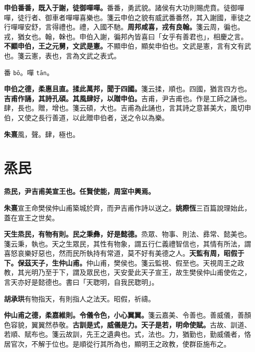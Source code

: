 \textbf{申伯番番，既入于謝，徒御嘽嘽。}{\footnotesize 番番，勇武貌。諸侯有大功則賜虎賁。徒御嘽嘽，徒行者、御車者嘽嘽喜樂也。箋云申伯之貌有威武番番然，其入謝國，車徒之行嘽嘽安舒，言得禮也。禮，入國不馳。}\textbf{周邦咸喜，戎有良翰。}{\footnotesize 箋云周，徧也。戎，猶女也。翰，榦也。申伯入謝，徧邦內皆喜曰「女乎有善君也」，相慶之言。}\textbf{不顯申伯，王之元舅，文武是憲。}{\footnotesize 不顯申伯，顯矣申伯也。文武是憲，言有文有武也。箋云憲，表也，言為文武之表式。}

\begin{quoting}番 \texttt{bō}。嘽 \texttt{tān}。\end{quoting}

\textbf{申伯之德，柔惠且直。揉此萬邦，聞于四國。}{\footnotesize 箋云揉，順也。四國，猶言四方也。}\textbf{吉甫作誦，其詩孔碩。其風肆好，以贈申伯。}{\footnotesize 吉甫，尹吉甫也。作是工師之誦也。肆，長也。贈，增也。箋云碩，大也。吉甫為此誦也，言其詩之意甚美大，風切申伯，又使之長行善道，以此贈申伯者，送之令以為樂。}

\begin{quoting}\textbf{朱熹}風，聲。肆，極也。\end{quoting}

\section{烝民}


\textbf{烝民，尹吉甫美宣王也。任賢使能，周室中興焉。}

\begin{quoting}\textbf{朱熹}宣王命樊侯仲山甫築城於齊，而尹吉甫作詩以送之。\textbf{姚際恆}三百篇說理始此，蓋在宣王之世矣。\end{quoting}

\textbf{天生烝民，有物有則。民之秉彝，好是懿德。}{\footnotesize 烝眾、物事、則法、彞常、懿美也。箋云秉，執也。天之生眾民，其性有物象，謂五行仁義禮智信也，其情有所法，謂喜怒哀樂好惡也，然而民所執持有常道，莫不好有美德之人。}\textbf{天監有周，昭假于下。保茲天子，生仲山甫。}{\footnotesize 仲山甫，樊侯也。箋云監視、假至也。天視周王之政教，其光明乃至于下，謂及眾民也，天安愛此天子宣王，故生樊侯仲山甫使佐之，言天亦好是懿德也。書曰「天聦明，自我民聦明」。}

\begin{quoting}\textbf{胡承珙}有物指天，有則指人之法天。昭假，祈禱。\end{quoting}

\textbf{仲山甫之德，柔嘉維則。令儀令色，小心翼翼。}{\footnotesize 箋云嘉美、令善也。善威儀，善顏色容貌，翼翼然恭敬。}\textbf{古訓是式，威儀是力。天子是若，明命使賦。}{\footnotesize 古故、訓道、若順、賦布也。箋云故訓，先王之遺典也。式，法也。力，猶勤也，勤威儀者，恪居官次，不解于位也。是順從行其所為也，顯明王之政教，使群臣施布之。}

